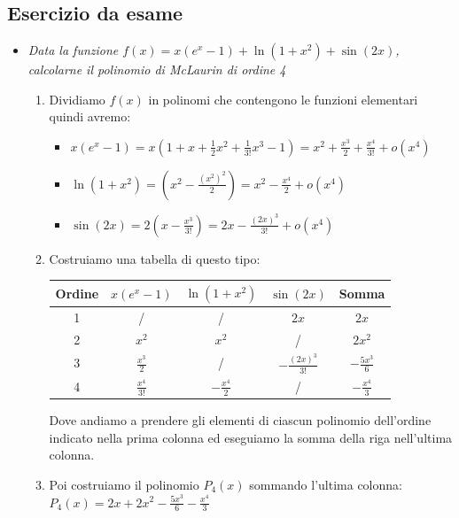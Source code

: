 \documentclass[10pt, a4paper]{article}
\begin{document}
    \subsection{Esercizio da esame}
        \begin{itemize}
            \item \textit{Data la funzione $f(x)=x(e^x-1)+\ln(1+x^2)+\sin(2x)$, calcolarne il polinomio di McLaurin di ordine 4} \begin{enumerate}
                \item Dividiamo $f(x)$ in polinomi che contengono le funzioni elementari quindi avremo: \begin{itemize}
                    \item $x(e^x-1)=x\left(1+x+\frac{1}{2}x^2+\frac{1}{3!}x^3-1\right)=x^2+\frac{x^3}{2}+\frac{x^4}{3!}+o\left(x^4\right)$
                    \item $\ln(1+x^2)=\left(x^2-\frac{(x^2)^2}{2}\right)=x^2-\frac{x^4}{2}+o\left(x^4\right)$
                    \item $\sin(2x)=2\left(x-\frac{x^3}{3!}\right)=2x-\frac{(2x)^3}{3!}+o\left(x^4\right)$
                \end{itemize}
                \item Costruiamo una tabella di questo tipo: 
                \begin{center}
                    \begin{tabular}{| c | c | c | c | c |}
                        \hline
                        \textbf{Ordine} & $x(e^x-1)$ & $\ln(1+x^2)$ & $\sin(2x)$ & \textbf{Somma}\\
                        \hline
                        1 & / & / & $2x$ & $2x$ \\
                        \hline
                        2 & $x^2$ & $x^2$ & / & $2x^2$\\
                        \hline
                        3 & $\frac{x^3}{2}$ & / & $-\frac{(2x)^3}{3!}$ & $-\frac{5x^3}{6}$\\
                        \hline
                        4 & $\frac{x^4}{3!}$ & $-\frac{x^4}{2}$ & / & $-\frac{x^4}{3}$\\
                        \hline
                    \end{tabular}
                \end{center}
                Dove andiamo a prendere gli elementi di ciascun polinomio dell'ordine indicato nella prima colonna ed eseguiamo la somma della riga nell'ultima colonna.
                \item Poi costruiamo il polinomio $P_4(x)$ sommando l'ultima colonna: $P_4(x)=2x+2x^2-\frac{5x^3}{6}-\frac{x^4}{3}$

\end{enumerate}
\end{itemize}
\end{document}
